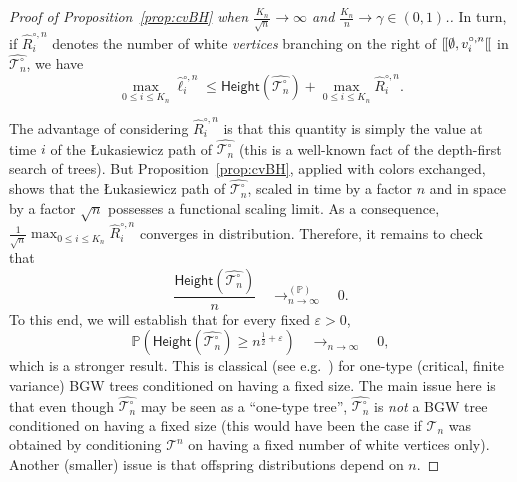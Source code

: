 \documentclass[AHL,XML,longabstracts,Unicode]{cedram}
\renewcommand{\P}{\mathbb{P}}
\def\Ts{\mathscr{T}}
\renewcommand{\epsilon}{\varepsilon}
\renewcommand\Pr[1]{\mathbb{P}\left(#1\right)}
\def\llbracket{[\hspace{-.10em} [ }
\begin{document}
\begin{proof}[Proof of  Proposition~\ref{prop:cvBH}  when $\tfrac{K_{n}}{\sqrt{n}} \rightarrow \infty$ and $ \tfrac{K_{n}}{n}  \rightarrow \gamma \in (0,1)$.]
In turn, if $\hat{R}^{\circ,n}_{i}$ denotes the number of white \emph{vertices}  branching on the right of  $\llbracket \emptyset, v^{\circ,n}_{i} \llbracket$ in $\hat{\Ts^{\circ}_{n}}$, we have
\[\max_{0 \leq i  \leq K_{n}} \hat{\ell}^{\circ,n}_{i} \leq \mathsf{Height}(\hat{\Ts^{\circ}_{n}})+ \max_{0 \leq i  \leq K_{n}} \hat{R}^{\circ,n}_{i}.\]


The advantage of considering  $\hat{R}^{\circ,n}_{i}$ is that this quantity is simply the value at time $i$ of the {\L}ukasiewicz path of $\hat{\Ts^{\circ}_{n}}$ (this  is a well-known fact of the depth-first search of trees). But Proposition~\ref{prop:cvBH}, applied with colors exchanged, shows that  the {\L}ukasiewicz path of $\hat{\Ts^{\circ}_{n}}$, scaled in time by a factor $n$ and in space by a factor $\sqrt{n}$ possesses a functional scaling limit. As a consequence, $\tfrac{1}{\sqrt{n}} \max_{0 \leq i \leq  K_{n}} \hat{R}^{\circ,n}_{i}$ converges in distribution. Therefore, it remains to check that
\[\frac{\mathsf{Height}(\hat{\Ts^{\circ}_{n}})}{n}  \quad \mathop{\longrightarrow}^{(\P)}_{n \rightarrow \infty} \quad 0.\]
To this end, we will establish that for every fixed $\epsilon>0$,
\begin{equation}
\label{eq:height}\Pr{\mathsf{Height}(\hat{\Ts^{\circ}_{n}}) \geq n^{ \tfrac{1}{2} +\epsilon}}   \quad \mathop{\longrightarrow}_{n \rightarrow \infty} \quad 0,
\end{equation}
which is a stronger result. This is classical (see e.g.~\cite{BK00,MM03}) for one-type (critical, finite variance) BGW trees conditioned on having a fixed size. The main issue here is that even though $\hat{\Ts^{\circ}_{n}}$ may be seen as a ``one-type tree'', $\hat{\Ts^{\circ}_{n}}$ is \emph{not} a BGW tree conditioned on having a fixed size (this would have been the case if $\Ts_{n}$ was obtained by  conditioning $\Ts^{n}$ on having a fixed number of white vertices only). Another (smaller) issue is that  offspring distributions depend on $n$.



\end{proof}
\end{document}
